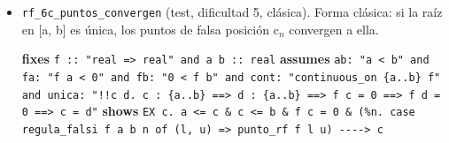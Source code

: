 \documentclass[11pt,a4paper]{article}
\begin{document}
\begin{itemize}
  \item \texttt{rf\_\allowbreak{}6c\_\allowbreak{}puntos\_\allowbreak{}convergen} (test, dificultad 5, clásica). Forma clásica: si la raíz en [a, b] es única, los puntos de falsa posición c$_{n}$ convergen a ella.\\
  {\footnotesize \textbf{fixes} \texttt{f :\allowbreak{}:\allowbreak{} "real =\allowbreak{}> real" and a b :\allowbreak{}:\allowbreak{} real} \textbf{assumes} \texttt{ab:\allowbreak{} "a < b" and fa:\allowbreak{} "f a < 0" and fb:\allowbreak{} "0 < f b" and cont:\allowbreak{} "continuous\_\allowbreak{}on \{a..b\} f" and unica:\allowbreak{} "!{}!c d. c :\allowbreak{} \{a..b\} =\allowbreak{}=\allowbreak{}> d :\allowbreak{} \{a..b\} =\allowbreak{}=\allowbreak{}> f c =\allowbreak{} 0 =\allowbreak{}=\allowbreak{}> f d =\allowbreak{} 0 =\allowbreak{}=\allowbreak{}> c =\allowbreak{} d"} \textbf{shows} \texttt{EX c. a <=\allowbreak{} c \&\allowbreak{} c <=\allowbreak{} b \&\allowbreak{} f c =\allowbreak{} 0 \&\allowbreak{} (\allowbreak{}\%n. case regula\_\allowbreak{}falsi f a b n of (\allowbreak{}l,\allowbreak{} u) =\allowbreak{}> punto\_\allowbreak{}rf f l u) -\allowbreak{}{}-\allowbreak{}{}-\allowbreak{}{}-\allowbreak{}{}> c}\par}
\end{itemize}
\end{document}
